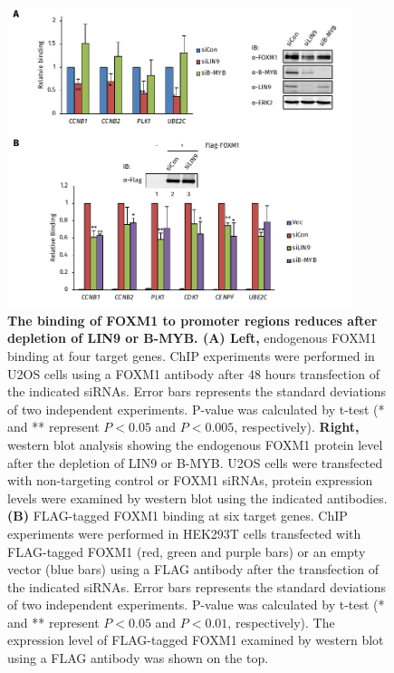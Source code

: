 \begin{figure}[!h]
    \centering
    \includegraphics[width=0.9\textwidth]{chapter3/figures_foxm1/fig30.pdf}
    \caption[The binding of FOXM1 to promoter regions reduces after depletion of LIN9 or B-MYB]{\textbf{The binding of FOXM1 to promoter regions reduces after depletion of LIN9 or B-MYB. (A) Left,} endogenous FOXM1 binding at four target genes. ChIP experiments were performed in U2OS cells using a FOXM1 antibody after 48 hours transfection of the indicated siRNAs. Error bars represents the standard deviations of two independent experiments. P-value was calculated by t-test (* and ** represent $P<0.05$ and $P<0.005$, respectively). \textbf{Right,} western blot analysis showing the endogenous FOXM1 protein level after the depletion of LIN9 or B-MYB. U2OS cells were transfected with non-targeting control or FOXM1 siRNAs, protein expression levels were examined by western blot using the indicated antibodies. \textbf{(B)} FLAG-tagged FOXM1 binding at six target genes. ChIP experiments were performed in HEK293T cells transfected with FLAG-tagged FOXM1 (red, green and purple bars) or an empty vector (blue bars) using a FLAG antibody after the transfection of the indicated siRNAs. Error bars represents the standard deviations of two independent experiments. P-value was calculated by t-test (* and ** represent $P<0.05$ and $P<0.01$, respectively). The expression level of FLAG-tagged FOXM1 examined by western blot using a FLAG antibody was shown on the top.}
    \label{fig:fig30}
\end{figure}

